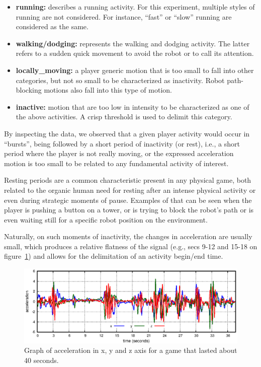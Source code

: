 \begin{itemize}
\item  \textbf{running:} describes a running activity. For this experiment, multiple styles of running are not considered. For instance, ``fast'' or ``slow'' running are considered as the same.
\item \textbf{walking/dodging:} represents the walking and dodging activity. The latter refers to a sudden quick movement to avoid the robot or to call its attention.
\item  \textbf{locally\_moving:} a player generic motion that is too small to fall into other categories, but not so small to be characterized as inactivity. Robot path-blocking motions also fall into this type of motion.
\item  \textbf{inactive:} motion that are too low in intensity to be characterized as one of the above activities. A crisp threshold is used to delimit this category. 
\end{itemize}

By inspecting the data, we observed that a given player activity would occur in ``bursts'', being followed by a short period of inactivity (or rest), i.e., a short period where the player is not really moving, or the expressed acceleration motion is too small to be related to any fundamental activity of interest.

Resting periods are a common characteristic present in any physical game, both related to the organic human need for resting after an intense physical activity or even during strategic moments of pause. Examples of that can be seen when the player is pushing a button on a tower, or is trying to block the robot's path or is even waiting still for a specific robot position on the environment.

Naturally, on such moments of inactivity, the changes in acceleration are usually small, which produces a relative flatness of the signal (e.g., secs 9-12 and 15-18 on figure~\ref{acc_graph}) and allows for the delimitation of an activity begin/end time.

\begin{figure}[h!]
      \centering
      \includegraphics[width=\linewidth]{images/04-activity/newGraph.eps}
      \caption{Graph of acceleration in x, y and z axis for a game that lasted about 40 seconds.}
      \label{acc_graph}
\end{figure}

